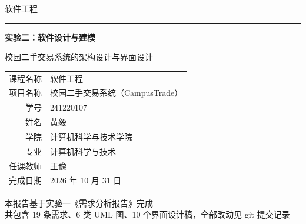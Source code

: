 \documentclass[UTF8,a4paper,11pt]{ctexart}
\begin{document}

\begin{titlepage}
\thispagestyle{empty}
\begin{center}
\vspace*{1.6cm}

{\heiti 软\quad 件\quad 工\quad 程}\\[6pt]
{\color{accent}\rule{3.6cm}{0.9pt}}

\vspace{1.5cm}
{\heiti\bfseries 实验二：软件设计与建模}

\vspace{0.9cm}
{\kaishu 校园二手交易系统的架构设计与界面设计}

\vspace{2.2cm}

\renewcommand{\arraystretch}{1.75}
{\songti
\begin{tabular}{r@{\hspace{0.7em}}l}
\toprule
课程名称 & 软件工程 \\
项目名称 & 校园二手交易系统（CampusTrade）\\
学\qquad 号 & 241220107 \\
姓\qquad 名 & 黄\quad 毅 \\
学\qquad 院 & 计算机科学与技术学院 \\
专\qquad 业 & 计算机科学与技术 \\
任课教师 & 王\quad 豫 \\
完成日期 & 2026 年 10 月 31 日 \\
\bottomrule
\end{tabular}
}

\vfill
{\songti\color{gray}
本报告基于实验一《需求分析报告》完成\\
共包含 19 条需求、6 类 UML 图、10 个界面设计稿，全部改动见 git 提交记录}
\end{center}
\end{titlepage}

\setcounter{page}{1}
\setcounter{tocdepth}{2}
\tableofcontents
\clearpage
{}
\setcounter{page}{1}






\end{document}
